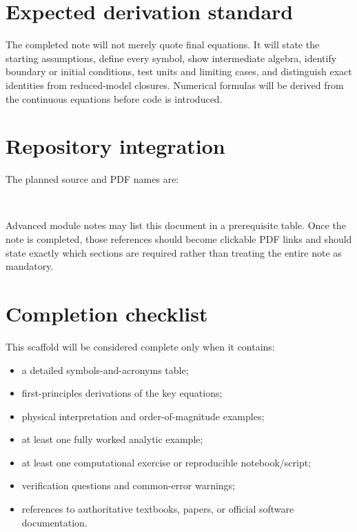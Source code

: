 \documentclass[11pt]{article}
\begin{document}
\section{Expected derivation standard}
The completed note will not merely quote final equations. It will state the starting assumptions, define every symbol, show intermediate algebra, identify boundary or initial conditions, test units and limiting cases, and distinguish exact identities from reduced-model closures. Numerical formulas will be derived from the continuous equations before code is introduced.

\section{Repository integration}
The planned source and PDF names are:
\begin{center}
\\
\end{center}
Advanced module notes may list this document in a prerequisite table. Once the note is completed, those references should become clickable PDF links and should state exactly which sections are required rather than treating the entire note as mandatory.

\section{Completion checklist}
This scaffold will be considered complete only when it contains:
\begin{itemize}[leftmargin=1.6em]
\item a detailed symbols-and-acronyms table;
\item first-principles derivations of the key equations;
\item physical interpretation and order-of-magnitude examples;
\item at least one fully worked analytic example;
\item at least one computational exercise or reproducible notebook/script;
\item verification questions and common-error warnings;
\item references to authoritative textbooks, papers, or official software documentation.
\end{itemize}
\end{document}
